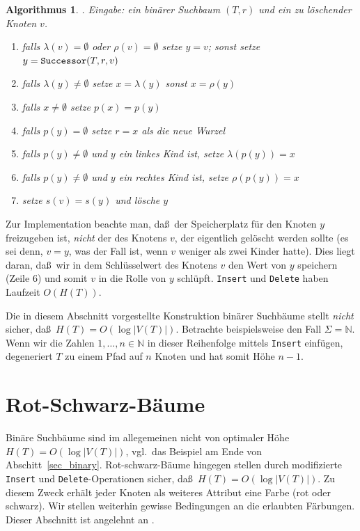 \documentclass[10pt,reqno]{amsart}
\numberwithin{equation}{section}
\newcommand\NN{\mathbb N}
\newtheorem{algorithm}[definition]{Algorithmus}
\begin{document}
\begin{algorithm}. {\em Eingabe:} ein bin\"arer Suchbaum $(T,r)$ und ein zu l\"oschender Knoten $v$.\label{alg_del}
	\begin{enumerate}
		\item falls $\lambda(v)=\emptyset$ oder $\rho(v)=\emptyset$ setze $y=v$; sonst setze $y=\mbox{\tt Successor}(T,r,v)$
		\item falls $\lambda(y)\neq\emptyset$ setze $x=\lambda(y)$ sonst $x=\rho(y)$
		\item falls $x\neq\emptyset$ setze $p(x)=p(y)$
		\item falls $p(y)=\emptyset$ setze $r=x$ als die neue Wurzel
		\item falls $p(y)\neq\emptyset$ und $y$ ein linkes Kind ist, setze $\lambda(p(y))=x$
		\item falls $p(y)\neq\emptyset$ und $y$ ein rechtes Kind ist, setze $\rho(p(y))=x$
		\item setze $s(v)=s(y)$ und l\"osche $y$
	\end{enumerate}
\end{algorithm}

Zur Implementation beachte man, da\ss\ der Speicherplatz f\"ur den Knoten $y$ freizugeben ist, {\em nicht} der des Knotens $v$, der eigentlich gel\"oscht werden sollte (es sei denn, $v=y$, was der Fall ist, wenn $v$ weniger als zwei Kinder hatte).
Dies liegt daran, da\ss\ wir in dem Schl\"usselwert des Knotens $v$ den Wert von $y$ speichern (Zeile 6) und somit $v$ in die Rolle von $y$ schl\"upft.
{\tt Insert} und {\tt Delete} haben Laufzeit $O(H(T))$.

Die in diesem Abschnitt vorgestellte Konstruktion bin\"arer Suchb\"aume stellt {\em nicht} sicher, da\ss\ $H(T)=O(\log |V(T)|)$.
Betrachte beispielsweise den Fall $\Sigma=\NN$.
Wenn wir die Zahlen $1,\ldots,n\in\NN$ in dieser Reihenfolge mittels {\tt Insert} einf\"ugen, degeneriert $T$ zu einem Pfad auf $n$ Knoten und hat somit H\"ohe $n-1$.

\section{Rot-Schwarz-B\"aume}\label{sec_redblack}

\noindent
Bin\"are Suchb\"aume sind im allegemeinen nicht von optimaler H\"ohe $H(T)=O(\log|V(T)|)$, vgl.\ das Beispiel am Ende von Abschitt~\ref{sec_binary}.
Rot-schwarz-B\"aume hingegen stellen durch modifizierte {\tt Insert} und {\tt Delete}-Operationen sicher, da\ss\ $H(T)=O(\log|V(T)|)$.
Zu diesem Zweck erh\"alt jeder Knoten als weiteres Attribut eine Farbe (rot oder schwarz).
Wir stellen weiterhin gewisse Bedingungen an die erlaubten F\"arbungen.
Dieser Abschnitt ist angelehnt an \cite{Cormen}.
\end{document}
